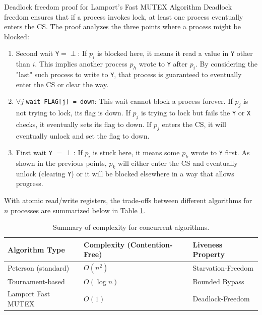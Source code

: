 \begin{Demonstration}{Deadlock freedom proof for Lamport’s Fast MUTEX Algorithm}{}
Deadlock freedom ensures that if a process invokes lock, at least one process eventually enters the CS. The proof analyzes the three points where a process might be blocked:
\begin{enumerate}
    \item Second wait \texttt{Y}$= \perp$: If $p_i$ is blocked here, it means it read a value in \texttt{Y} other than $i$. This implies another process $p_h$ wrote to \texttt{Y} after $p_i$. By considering the "last" such process to write to \texttt{Y}, that process is guaranteed to eventually enter the CS or clear the way.
    \item $\forall j$ \texttt{wait FLAG[j] = down}: This wait cannot block a process forever. If $p_j$ is not trying to lock, its flag is down. If $p_j$ is trying to lock but fails the \texttt{Y} or \texttt{X} checks, it eventually sets its flag to down. If $p_j$ enters the CS, it will eventually unlock and set the flag to down.
    \item First wait \texttt{Y} $= \perp$: If $p_i$ is stuck here, it means some $p_k$ wrote to \texttt{Y} first. As shown in the previous points, $p_k$ will either enter the CS and eventually unlock (clearing \texttt{Y}) or it will be blocked elsewhere in a way that allows progress.
\end{enumerate}
\end{Demonstration}

With atomic read/write registers, the trade-offs between different algorithms for $n$ processes are summarized below in Table \ref{tab:summary-complexity}.
\begin{table}[ht]
    \centering
    \begin{tabular}{|l|p{3.1cm}|l|}
         \hline
         \textbf{Algorithm Type} & \textbf{Complexity (Contention-Free)} & \textbf{Liveness Property}\\
         \hline
         Peterson (standard) & $O(n^2)$ & Starvation-Freedom\\
         \hline
         Tournament-based & $O(\log n)$ & Bounded Bypass\\
         \hline
         Lamport Fast MUTEX & $O(1)$ & Deadlock-Freedom\\
         \hline
    \end{tabular}
    \caption{Summary of complexity for concurrent algorithms.}
    \label{tab:summary-complexity}
\end{table}

